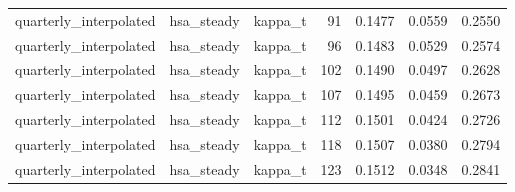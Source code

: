 \begin{tabular}{lllrrrr}
quarterly\_interpolated & hsa\_steady & kappa\_t & 91 & 0.1477 & 0.0559 & 0.2550 \\
quarterly\_interpolated & hsa\_steady & kappa\_t & 96 & 0.1483 & 0.0529 & 0.2574 \\
quarterly\_interpolated & hsa\_steady & kappa\_t & 102 & 0.1490 & 0.0497 & 0.2628 \\
quarterly\_interpolated & hsa\_steady & kappa\_t & 107 & 0.1495 & 0.0459 & 0.2673 \\
quarterly\_interpolated & hsa\_steady & kappa\_t & 112 & 0.1501 & 0.0424 & 0.2726 \\
quarterly\_interpolated & hsa\_steady & kappa\_t & 118 & 0.1507 & 0.0380 & 0.2794 \\
quarterly\_interpolated & hsa\_steady & kappa\_t & 123 & 0.1512 & 0.0348 & 0.2841 \\
\bottomrule
\end{tabular}
